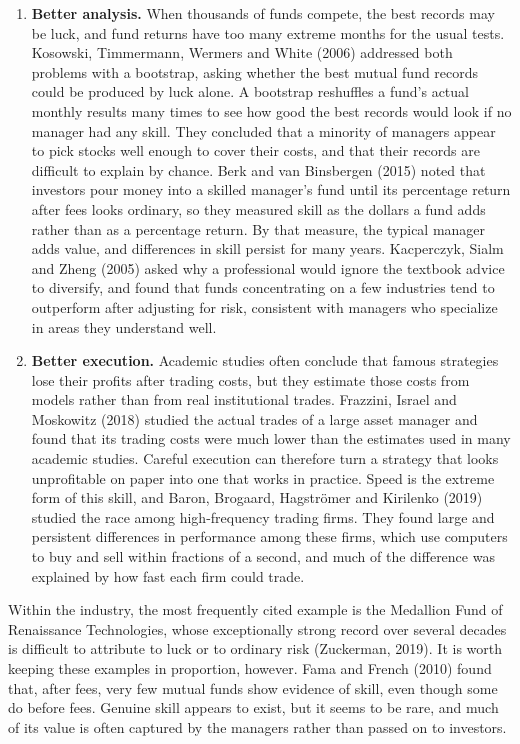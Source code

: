 \begin{itemize}
\begin{enumerate}
    \item \textbf{Better analysis.} When thousands of funds compete, the best
  records may be luck, and fund returns have too many extreme months for the
  usual tests. Kosowski, Timmermann, Wermers and White (2006) addressed both
  problems with a bootstrap, asking whether the best mutual
  fund records could be produced by luck alone. A bootstrap reshuffles a fund's actual monthly
  results many times to see how good the best records would look if no
  manager had any skill. They concluded that a minority of managers appear
  to pick stocks well enough to cover their costs, and that their records are
  difficult to explain by chance. Berk and van Binsbergen (2015) noted that
  investors pour money into a skilled manager's fund until its percentage
  return after fees looks ordinary, so they measured skill as the dollars a
  fund adds rather than as a percentage return. By
  that measure, the typical manager adds value, and differences in skill
  persist for many years. Kacperczyk, Sialm and Zheng (2005) asked why a
  professional would ignore the textbook advice to diversify, and found that
  funds concentrating on a few industries tend to outperform after adjusting for
  risk, consistent with managers who specialize in areas they understand well.

    \item \textbf{Better execution.} Academic studies often conclude that
  famous strategies lose their profits after trading costs, but they estimate
  those costs from models rather than from real institutional trades.
  Frazzini, Israel and Moskowitz (2018) studied the actual trades of a large
  asset manager and found that its trading costs were much lower than the
  estimates used in many academic studies. Careful
  execution can therefore turn a strategy that looks unprofitable on paper
  into one that works in practice. Speed is the extreme form of this
  skill, and Baron, Brogaard, Hagstr\"om{}er and Kirilenko (2019) studied the
  race among high-frequency trading firms. They found large and persistent
  differences in performance among these firms, which use computers to buy and sell
  within fractions of a second, and much of the difference was
  explained by how fast each firm could trade.
  
  \end{enumerate}

  Within the industry, the most frequently cited example is the Medallion
  Fund of Renaissance Technologies, whose exceptionally strong record over
  several decades is difficult to attribute to luck or to ordinary risk
  (Zuckerman, 2019). It is worth keeping these examples in proportion,
  however. Fama and French (2010) found that, after fees, very few mutual
  funds show evidence of skill, even though some do before fees. Genuine
  skill appears to exist, but it seems to be rare, and much of its value is
  often captured by the managers rather than passed on to investors.
  
  
\end{itemize}




